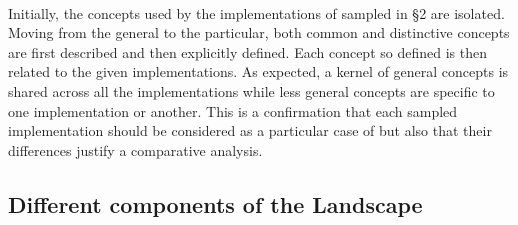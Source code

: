 \documentclass{sig-alternate}
\begin{document}
 \\
Initially, the concepts used by the implementations of \pilotjob sampled in \S2 are isolated. Moving from the general to the particular, both common and distinctive concepts are first described and then explicitly defined. Each concept so defined is then related to the given \pilotjob implementations. As expected, a kernel of general concepts is shared across all the implementations while less general concepts are specific to one implementation or another. This is a confirmation that each sampled implementation should be considered as a particular case of \pilotjob but also that their differences justify a comparative analysis.


\subsection{Different components of the Landscape}
\end{document}

